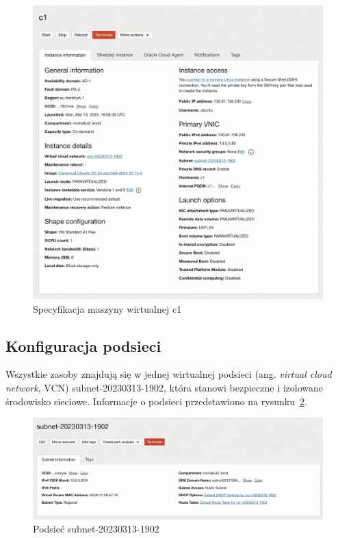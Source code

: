 \begin{figure}[H]
    \centering
    \includegraphics[width=\textwidth]{img/oci-instance-details}
    \caption{Specyfikacja maszyny wirtualnej c1}
    \label{fig:oci-instance-details}
\end{figure}

\subsection{Konfiguracja podsieci}

Wszystkie zasoby znajdują się w jednej wirtualnej podsieci (ang. \emph{virtual cloud network}, VCN) subnet-20230313-1902, która stanowi bezpieczne i izolowane środowisko sieciowe.
Informacje o podsieci przedstawiono na rysunku~\ref{fig:oci-subnet}.

\begin{figure}[H]
    \centering
    \includegraphics[width=\textwidth]{img/oci-subnet}
    \caption{Podsieć subnet-20230313-1902}
    \label{fig:oci-subnet}
\end{figure}


